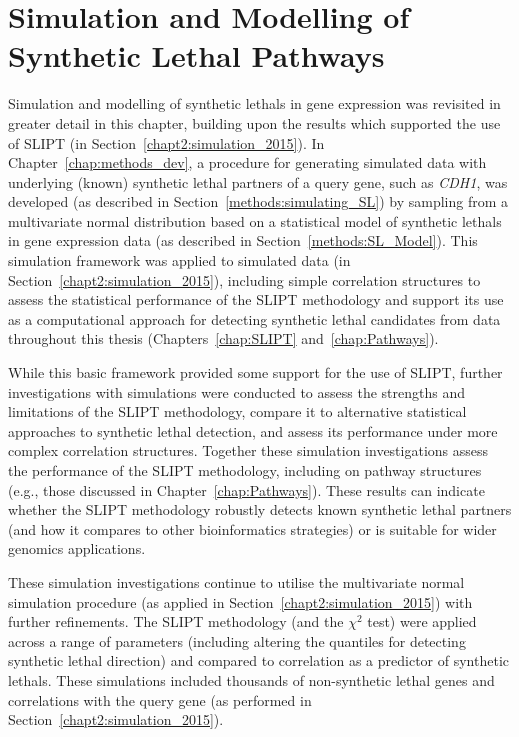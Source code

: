 \chapter{Simulation and Modelling of Synthetic Lethal Pathways}
\label{chap:simulation}

Simulation and modelling of \glspl{synthetic lethal} in \gls{gene expression} was revisited in greater detail in this chapter, building upon the results which supported the use of \gls{SLIPT} (in Section~\ref{chapt2:simulation_2015}). In Chapter~\ref{chap:methods_dev}, a procedure for generating simulated data with underlying (known) \gls{synthetic lethal} partners of a query gene, such as \textit{CDH1}, was developed (as described in Section~\ref{methods:simulating_SL}) by sampling from a multivariate normal distribution based on a statistical model of \glspl{synthetic lethal} in \gls{gene expression} data (as described in Section~\ref{methods:SL_Model}). This simulation framework was applied to simulated data (in Section~\ref{chapt2:simulation_2015}), including simple correlation structures to assess the statistical performance of the \gls{SLIPT} methodology and support its use as a computational approach for detecting \gls{synthetic lethal} candidates from  data throughout this thesis (Chapters~\ref{chap:SLIPT} and~\ref{chap:Pathways}). 

While this basic framework provided some support for the use of \gls{SLIPT}, further investigations with simulations were conducted to assess the strengths and limitations of the \gls{SLIPT} methodology, compare it to alternative statistical approaches to \gls{synthetic lethal} detection, and assess its performance under more complex correlation structures. Together these simulation investigations assess the performance of the \gls{SLIPT} methodology, including on pathway  structures (e.g., those discussed in Chapter~\ref{chap:Pathways}). These results can indicate whether the \gls{SLIPT} methodology robustly detects known \gls{synthetic lethal} partners (and how it compares to other \gls{bioinformatics} strategies) or is suitable for wider \glspl{genomic} applications.

These simulation investigations continue to utilise the multivariate normal simulation procedure (as applied in Section~\ref{chapt2:simulation_2015}) with further refinements. The \gls{SLIPT} methodology (and the $\chi^2$ test) were applied across a range of parameters (including altering the quantiles for detecting \gls{synthetic lethal} direction) and compared to correlation as a predictor of \glspl{synthetic lethal}. These simulations included thousands of non-synthetic lethal genes and correlations with the query gene (as performed in Section~\ref{chapt2:simulation_2015}).


